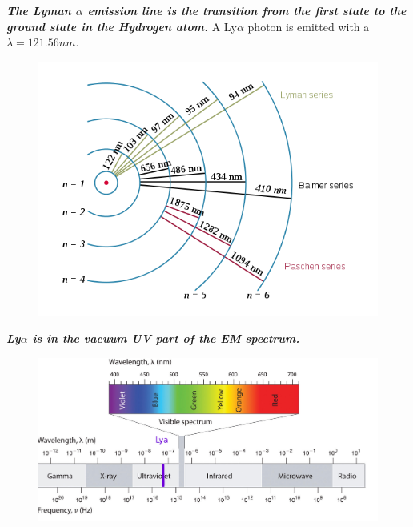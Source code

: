 \documentclass{beamer}
\begin{document}
\begin{frame}{\textit{\textbf{The Lyman $\alpha$ emission line is the transition from the first state to the ground state in the Hydrogen atom.}}}
A Ly$\alpha$ photon is emitted with a $\lambda= 121.56 nm$.
\begin{figure}
\includegraphics[scale=0.4]{Figures/Hydrogen_transitions.png}
\end{figure}
\end{frame}

\begin{frame}{\textit{\textbf{Ly$\alpha$ is in the vacuum UV part of the EM spectrum.}}}
\begin{figure}
\centering
\includegraphics[scale=0.18]{Figures/em.jpg}
\end{figure}
\end{frame}
\end{document}
